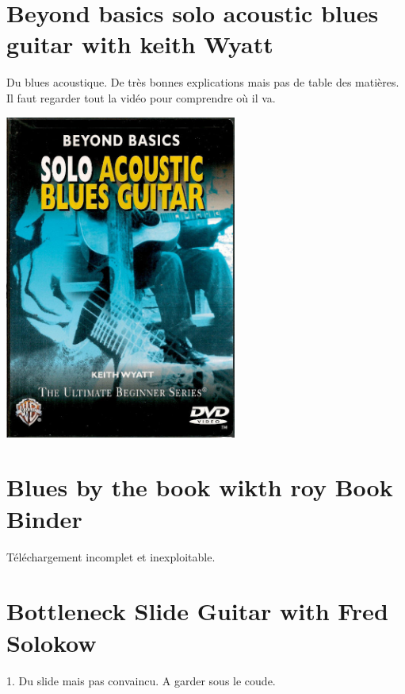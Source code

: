 \documentclass[a4paper]{book}
\begin{document}
\clearpage


\section[Beyond basics solo acoustic blues guitar with keith
Wyatt]{Beyond basics solo acoustic blues guitar with keith Wyatt}
\hypertarget{RefHeadingToc124973218262}{}


Du blues acoustique. De tr\`es bonnes explications mais pas de table des
mati\`eres. Il faut regarder tout la vid\'eo pour comprendre o\`u il
va.



\begin{center}
\includegraphics[width=7.62cm,height=10.668cm]{lebluessupportsmethodes-img58.jpg}
\end{center}



\clearpage


\section[Blues by the book wikth roy Book Binder]{Blues by the book
wikth roy Book Binder}
\hypertarget{RefHeadingToc126973218262}{}


T\'el\'echargement incomplet et inexploitable.




\clearpage


\section[Bottleneck Slide Guitar with Fred Solokow]{Bottleneck Slide
Guitar with Fred Solokow}
\hypertarget{RefHeadingToc128973218262}{}1. Du slide mais pas convaincu.
A garder sous le coude.
\end{document}

